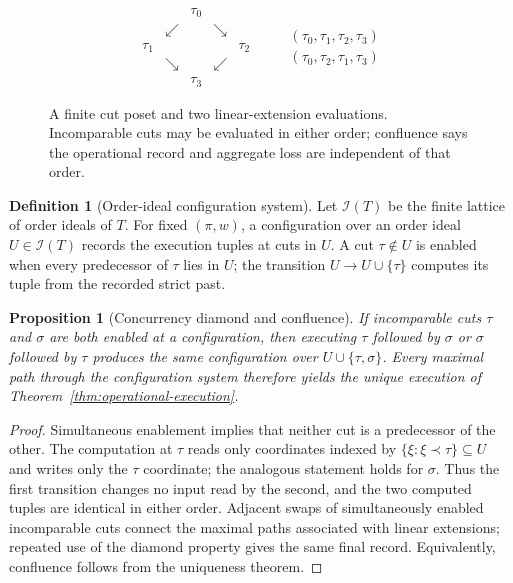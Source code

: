 \documentclass[11pt]{article}
\theoremstyle{plain}
\newtheorem{proposition}[theorem]{Proposition}
\theoremstyle{definition}
\newtheorem{definition}[theorem]{Definition}
\theoremstyle{remark}
\begin{document}
\begin{figure}[htbp]
\centering
\[
\begin{array}{ccccc}
&& \tau_0 &&\\[-1mm]
& \swarrow && \searrow &\\[-1mm]
\tau_1 &&&& \tau_2\\[-1mm]
& \searrow && \swarrow &\\[-1mm]
&& \tau_3 &&
\end{array}
\qquad
\begin{array}{l}
(\tau_0,\tau_1,\tau_2,\tau_3)\\
(\tau_0,\tau_2,\tau_1,\tau_3)
\end{array}
\]
\caption{A finite cut poset and two linear-extension evaluations. Incomparable
cuts may be evaluated in either order; confluence says the operational record and
aggregate loss are independent of that order.}
\label{fig:cut-poset-linearisation}
\end{figure}

\begin{definition}[Order-ideal configuration system]
\label{def:order-ideal-configuration}
Let $\mathcal I(T)$ be the finite lattice of order ideals of $T$. For fixed
$(\pi,w)$, a configuration over an order ideal $U\in\mathcal I(T)$ records the
execution tuples at cuts in $U$. A cut $\tau\notin U$ is enabled when every
predecessor of $\tau$ lies in $U$; the transition $U\to U\cup\{\tau\}$ computes
its tuple from the recorded strict past.
\end{definition}

\begin{proposition}[Concurrency diamond and confluence]
\label{prop:operational-confluence}
If incomparable cuts $\tau$ and $\sigma$ are both enabled at a configuration,
then executing $\tau$ followed by $\sigma$ or $\sigma$ followed by $\tau$
produces the same configuration over $U\cup\{\tau,\sigma\}$. Every maximal path
through the configuration system therefore yields the unique execution of
Theorem~\ref{thm:operational-execution}.
\end{proposition}

\begin{proof}
Simultaneous enablement implies that neither cut is a predecessor of the other.
The computation at $\tau$ reads only coordinates indexed by
$\{\xi:\xi\prec\tau\}\subseteq U$ and writes only the $\tau$ coordinate;
the analogous statement holds for $\sigma$. Thus the first transition changes
no input read by the second, and the two computed tuples are identical in either
order. Adjacent swaps of simultaneously enabled incomparable cuts connect the
maximal paths associated with linear extensions; repeated use of the diamond
property gives the same final record. Equivalently, confluence follows from the
uniqueness theorem.
\end{proof}
\end{document}
